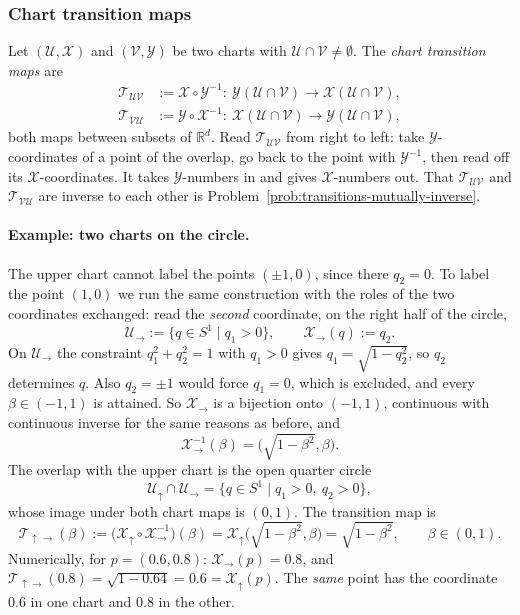 \documentclass[11pt]{article}
\begin{document}
\subsubsection*{Chart transition maps}
Let $(\mathcal U,\mathcal X)$ and $(\mathcal V,\mathcal Y)$ be two charts with $\mathcal U\cap\mathcal V\neq\emptyset$. The \emph{chart transition maps} are
\begin{align*}
\mathcal T_{\mathcal{UV}}&:=\mathcal X\circ\mathcal Y^{-1}:\ \mathcal Y(\mathcal U\cap\mathcal V)\longrightarrow\mathcal X(\mathcal U\cap\mathcal V),\\
\mathcal T_{\mathcal{VU}}&:=\mathcal Y\circ\mathcal X^{-1}:\ \mathcal X(\mathcal U\cap\mathcal V)\longrightarrow\mathcal Y(\mathcal U\cap\mathcal V),
\end{align*}
both maps between subsets of $\mathbb R^d$. Read $\mathcal T_{\mathcal{UV}}$ from right to left: take $\mathcal Y$-coordinates of a point of the overlap, go back to the point with $\mathcal Y^{-1}$, then read off its $\mathcal X$-coordinates. It takes $\mathcal Y$-numbers in and gives $\mathcal X$-numbers out. That $\mathcal T_{\mathcal{UV}}$ and $\mathcal T_{\mathcal{VU}}$ are inverse to each other is Problem~\ref{prob:transitions-mutually-inverse}.

\paragraph{Example: two charts on the circle.} The upper chart cannot label the points $(\pm1,0)$, since there $q_2=0$. To label the point $(1,0)$ we run the same construction with the roles of the two coordinates exchanged: read the \emph{second} coordinate, on the right half of the circle,
\[
\mathcal U_\to:=\{q\in S^1\mid q_1>0\},\qquad\mathcal X_\to(q):=q_2.
\]
On $\mathcal U_\to$ the constraint $q_1^2+q_2^2=1$ with $q_1>0$ gives $q_1=\sqrt{1-q_2^2}$, so $q_2$ determines $q$. Also $q_2=\pm1$ would force $q_1=0$, which is excluded, and every $\beta\in(-1,1)$ is attained. So $\mathcal X_\to$ is a bijection onto $(-1,1)$, continuous with continuous inverse for the same reasons as before, and
\[
\mathcal X_\to^{-1}(\beta)=\big(\sqrt{1-\beta^2},\beta\big).
\]
The overlap with the upper chart is the open quarter circle
\[
\mathcal U_\uparrow\cap\mathcal U_\to=\{q\in S^1\mid q_1>0,\ q_2>0\},
\]
whose image under both chart maps is $(0,1)$. The transition map is
\[
\mathcal T_{\uparrow\to}(\beta):=\big(\mathcal X_\uparrow\circ\mathcal X_\to^{-1}\big)(\beta)=\mathcal X_\uparrow\big(\sqrt{1-\beta^2},\beta\big)=\sqrt{1-\beta^2},\qquad\beta\in(0,1).
\]
Numerically, for $p=(0.6,0.8)$: $\mathcal X_\to(p)=0.8$, and $\mathcal T_{\uparrow\to}(0.8)=\sqrt{1-0.64}=0.6=\mathcal X_\uparrow(p)$. The \emph{same} point has the coordinate $0.6$ in one chart and $0.8$ in the other.
\end{document}
